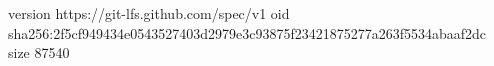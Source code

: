 version https://git-lfs.github.com/spec/v1
oid sha256:2f5cf949434e0543527403d2979e3c93875f23421875277a263f5534abaaf2dc
size 87540
